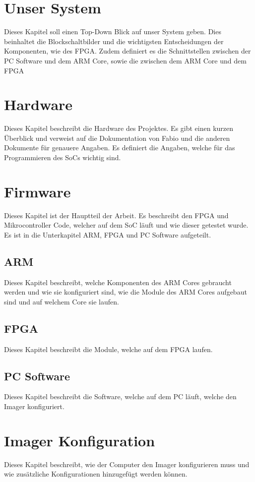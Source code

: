 \documentclass{article}
\begin{document}
\section{Unser System}
Dieses Kapitel soll einen Top-Down Blick auf unser System geben. Dies beinhaltet die Blockschaltbilder und die wichtigsten Entscheidungen der Komponenten, wie des FPGA. Zudem definiert es die Schnittstellen zwischen der PC Software und dem ARM Core, sowie die zwischen dem ARM Core und dem FPGA

\section{Hardware}
Dieses Kapitel beschreibt die Hardware des Projektes. Es gibt einen kurzen Überblick und verweist auf die Dokumentation von Fabio und die anderen Dokumente für genauere Angaben. Es definiert die Angaben, welche für das Programmieren des SoCs wichtig sind.

\section{Firmware}
Dieses Kapitel ist der Hauptteil der Arbeit. Es beschreibt den FPGA und Mikrocontroller Code, welcher auf dem SoC läuft und wie dieser getestet wurde. Es ist in die Unterkapitel ARM, FPGA und PC Software aufgeteilt.
\subsection{ARM}
Dieses Kapitel beschreibt, welche Komponenten des ARM Cores gebraucht werden und wie sie konfiguriert sind, wie die Module des ARM Cores aufgebaut sind und auf welchem Core sie laufen.
\subsection{FPGA}
Dieses Kapitel beschreibt die Module, welche auf dem FPGA laufen.
\subsection{PC Software}
Dieses Kapitel beschreibt die Software, welche auf dem PC läuft, welche den Imager konfiguriert.


\section{Imager Konfiguration}
Dieses Kapitel beschreibt, wie der Computer den Imager konfigurieren muss und wie zusätzliche Konfigurationen hinzugefügt werden können.
\end{document}
